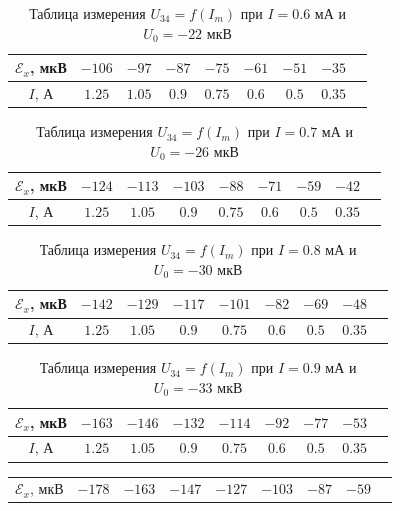 \documentclass[12pt]{article}
\begin{document}
\begin{enumerate}
\begin{table}[h!]
		\centering
		\begin{tabular}{|c|c|c|c|c|c|c|c|c|}
		\hline
			$\mathscr{E}_x$, мкВ & $-106$ & $-97$ & $-87$ & $-75$ & $-61$ & $-51$ & $-35$ \\
		\hline
			$I$, А & $1.25$ & $1.05$ & $0.9$ & $0.75$ & $0.6$ & $0.5$ & $0.35$ \\
		\hline	
		\end{tabular}
		\caption{Таблица измерения $U_\text{34} = f(I_m)$ при $I = 0.6$ мА и $U_0 = -22 $ мкВ}
	\end{table}
	\begin{table}[h!]
		\centering
		\begin{tabular}{|c|c|c|c|c|c|c|c|c|}
		\hline
			$\mathscr{E}_x$, мкВ & $-124$ & $-113$ & $-103$ & $-88$ & $-71$ & $-59$ & $-42$ \\
		\hline
			$I$, А & $1.25$ & $1.05$ & $0.9$ & $0.75$ & $0.6$ & $0.5$ & $0.35$\\
		\hline	
		\end{tabular}
		\caption{Таблица измерения $U_\text{34} = f(I_m)$ при $I = 0.7$ мА и $U_0 = -26$ мкВ}
	\end{table}
	\begin{table}[h!]
		\centering
		\begin{tabular}{|c|c|c|c|c|c|c|c|c|}
		\hline
			$\mathscr{E}_x$, мкВ & $-142$ & $-129$ & $-117$ & $-101$ & $-82$ & $-69$ & $-48$ \\
		\hline
			$I$, А & $1.25$ & $1.05$ & $0.9$ & $0.75$ & $0.6$ & $0.5$ & $0.35$\\
		\hline	
		\end{tabular}
		\caption{Таблица измерения $U_\text{34} = f(I_m)$ при $I = 0.8$ мА и $U_0 = -30 $ мкВ}
	\end{table}
	\begin{table}[h!]
		\centering
		\begin{tabular}{|c|c|c|c|c|c|c|c|c|}
		\hline
			$\mathscr{E}_x$, мкВ & $-163$ & $-146$ & $-132$ & $-114$ & $-92$ & $-77$ & $-53$\\
		\hline
			$I$, А & $1.25$ & $1.05$ & $0.9$ & $0.75$ & $0.6$ & $0.5$ & $0.35$\\
		\hline	
		\end{tabular}
		\caption{Таблица измерения $U_\text{34} = f(I_m)$ при $I = 0.9$ мА и $U_0 = -33 $ мкВ}
	\end{table}
	\begin{table}[h!]
		\centering
		\begin{tabular}{|c|c|c|c|c|c|c|c|c|}
		\hline
			$\mathscr{E}_x$, мкВ & $-178$ & $-163$ & $-147$ & $-127$ & $-103$ & $-87$ & $-59$ \\

\end{tabular}
\end{table}
\end{enumerate}
\end{document}
